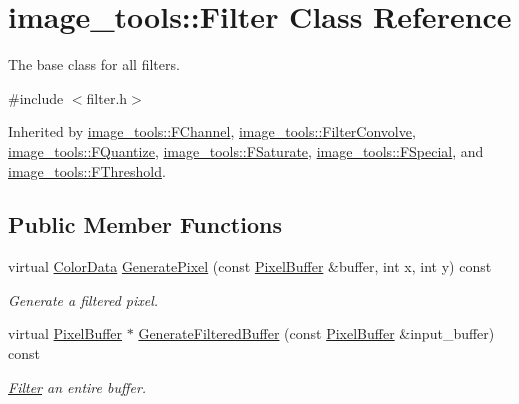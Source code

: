 \hypertarget{classimage__tools_1_1Filter}{}\section{image\+\_\+tools\+:\+:Filter Class Reference}
\label{classimage__tools_1_1Filter}


The base class for all filters.  




{\ttfamily \#include $<$filter.\+h$>$}



Inherited by \hyperlink{classimage__tools_1_1FChannel}{image\+\_\+tools\+::\+F\+Channel}, \hyperlink{classimage__tools_1_1FilterConvolve}{image\+\_\+tools\+::\+Filter\+Convolve}, \hyperlink{classimage__tools_1_1FQuantize}{image\+\_\+tools\+::\+F\+Quantize}, \hyperlink{classimage__tools_1_1FSaturate}{image\+\_\+tools\+::\+F\+Saturate}, \hyperlink{classimage__tools_1_1FSpecial}{image\+\_\+tools\+::\+F\+Special}, and \hyperlink{classimage__tools_1_1FThreshold}{image\+\_\+tools\+::\+F\+Threshold}.

\subsection*{Public Member Functions}
\begin{DoxyCompactItemize}
\item 
virtual \hyperlink{classimage__tools_1_1ColorData}{Color\+Data} \hyperlink{classimage__tools_1_1Filter_afd5d1be5736e343077d331896d4130d9}{Generate\+Pixel} (const \hyperlink{classimage__tools_1_1PixelBuffer}{Pixel\+Buffer} \&buffer, int x, int y) const 
\begin{DoxyCompactList}\small\item\em Generate a filtered pixel. \end{DoxyCompactList}\item 
virtual \hyperlink{classimage__tools_1_1PixelBuffer}{Pixel\+Buffer} $\ast$ \hyperlink{classimage__tools_1_1Filter_a1bdb19eb497a94ea13a2a0d7f6c0f0a5}{Generate\+Filtered\+Buffer} (const \hyperlink{classimage__tools_1_1PixelBuffer}{Pixel\+Buffer} \&input\+\_\+buffer) const 
\begin{DoxyCompactList}\small\item\em \hyperlink{classimage__tools_1_1Filter}{Filter} an entire buffer. \end{DoxyCompactList}\end{DoxyCompactItemize}


